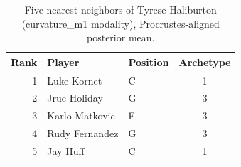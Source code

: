 \begin{table}[htbp]
  \centering\small
  \begin{tabular}{rllc}
    \toprule
    Rank & Player & Position & Archetype \\
    \midrule
    1 & Luke Kornet & C & 1 \\
    2 & Jrue Holiday & G & 3 \\
    3 & Karlo Matkovic & F & 3 \\
    4 & Rudy Fernandez & G & 3 \\
    5 & Jay Huff & C & 1 \\
    \bottomrule
  \end{tabular}
  \caption{Five nearest neighbors of Tyrese Haliburton (curvature_m1 modality), Procrustes-aligned posterior mean.}
  \label{tab:Tyrese_Haliburton_neighbors_curvature_m1}
\end{table}


